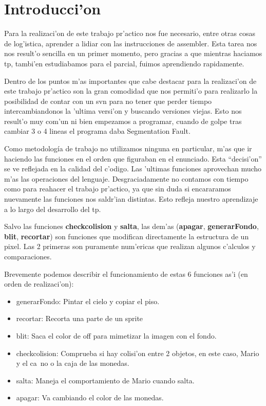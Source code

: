 \section{Introducci'on}

	Para la realizaci'on de este trabajo pr'actico nos fue necesario, entre
otras cosas de log'istica, aprender a lidiar con las instrucciones de assembler.
Esta tarea nos nos result'o sencilla en un primer momento, pero gracias a que
mientras haciamos tp, tambi'en estudiabamos para el parcial, fuimos aprendiendo
rapidamente.

	Dentro de los puntos m'as importantes que cabe destacar para la
realizaci'on de este trabajo pr'actico son la gran comodidad que nos permiti'o
para realizarlo la posibilidad de contar con un svn para no tener que perder
tiempo intercambiandonos la 'ultima versi'on y buscando versiones viejas. Esto
nos result'o muy com'un ni bien empezamos a programar, cuando de golpe tras
cambiar 3 o 4 lineas el programa daba Segmentation Fault.

	Como metodología de trabajo no utilizamos ninguna en particular, m'as que
ir haciendo las funciones en el orden que figuraban en el enunciado. Esta
``decisi'on'' se ve reflejada en la calidad del c'odigo. Las 'ultimas funciones
aprovechan mucho m'as las operaciones del lenguaje. Desgraciadamente no
contamos con tiempo como para reahacer el trabajo pr'actico, ya que sin duda si
encararamos nuevamente las funciones nos saldr'ian distintas. Esto refleja
nuestro aprendizaje a lo largo del desarrollo del tp.

	Salvo las funciones \textbf{checkcolision} y \textbf{salta}, las dem'as
(\textbf{apagar}, \textbf{generarFondo}, \textbf{blit}, \textbf{recortar}) son
funciones que modifican directamente la estructura de un pixel. Las 2 primeras
son puramente num'ericas que realizan algunos c'alculos y comparaciones.

	Brevemente podemos describir el funcionamiento de estas 6 funciones as'i
(en orden de realizaci'on):

\begin{itemize}
	\item generarFondo: Pintar el cielo y copiar el piso.
	\item recortar: Recorta una parte de un sprite
	\item blit: Saca el color de off para mimetizar la imagen con el fondo.
	\item checkcolision: Comprueba si hay colisi'on entre 2 objetos, en este
caso, Mario y el ca~no o la caja de las monedas.
	\item salta: Maneja el comportamiento de Mario cuando salta.
	\item apagar: Va cambiando el color de las monedas.
\end{itemize}

